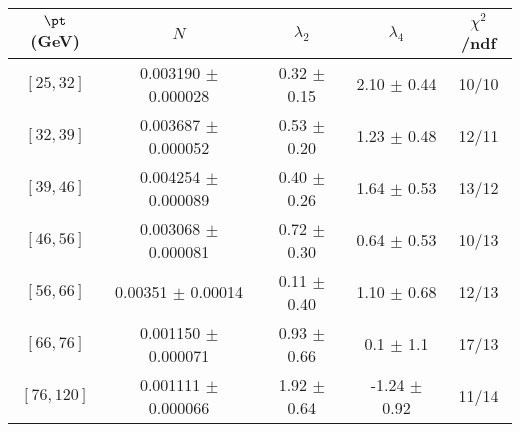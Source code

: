 \begin{tabular}{c||c|c|c|c}
$\pt$ (GeV) & $N$ & $\lambda_{2}$ & $\lambda_4$  & $\chi^2$/ndf  \\
\hline
$[25, 32]$ & 0.003190 $\pm$ 0.000028 & 0.32 $\pm$ 0.15 & 2.10 $\pm$ 0.44 & 10/10\\
$[32, 39]$ & 0.003687 $\pm$ 0.000052 & 0.53 $\pm$ 0.20 & 1.23 $\pm$ 0.48 & 12/11\\
$[39, 46]$ & 0.004254 $\pm$ 0.000089 & 0.40 $\pm$ 0.26 & 1.64 $\pm$ 0.53 & 13/12\\
$[46, 56]$ & 0.003068 $\pm$ 0.000081 & 0.72 $\pm$ 0.30 & 0.64 $\pm$ 0.53 & 10/13\\
$[56, 66]$ & 0.00351 $\pm$ 0.00014 & 0.11 $\pm$ 0.40 & 1.10 $\pm$ 0.68 & 12/13\\
$[66, 76]$ & 0.001150 $\pm$ 0.000071 & 0.93 $\pm$ 0.66 & 0.1 $\pm$ 1.1 & 17/13\\
$[76, 120]$ & 0.001111 $\pm$ 0.000066 & 1.92 $\pm$ 0.64 & -1.24 $\pm$ 0.92 & 11/14\\
\end{tabular}
